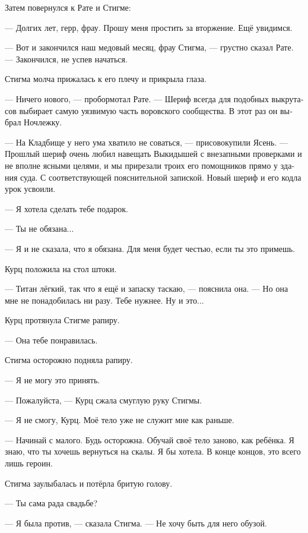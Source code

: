 \documentclass[a4paper,12pt,fleqn]{book}\usepackage{polyglossia}\setdefaultlanguage[babelshorthands=true]{russian}\setotherlanguage{english}\defaultfontfeatures{Ligatures=TeX,Mapping=tex-text}\usepackage{xcolor}\newcommand{\ml}[3]{#2}
\newcommand{\asterism}{\vspace{1em}{\centering\Large\bfseries$\ast~\ast~\ast$\par}\vspace{1em}}
\begin{document}
Затем повернулся к Рате и Стигме:

--- Долгих лет, герр, фрау.
Прошу меня простить за вторжение.
Ещё увидимся.

--- Вот и закончился наш медовый месяц, фрау Стигма, --- грустно сказал Рате.
--- Закончился, не успев начаться.

Стигма молча прижалась к его плечу и прикрыла глаза.

\asterism

--- Ничего нового, --- пробормотал Рате.
--- Шериф всегда для подобных выкрутасов выбирает самую уязвимую часть воровского сообщества.
В этот раз он выбрал Ночлежку.

--- На Кладбище у него ума хватило не соваться, --- присовокупили Ясень.
--- Прошлый шериф очень любил навещать Выкидышей с внезапными проверками и не вполне ясными целями, и мы прирезали троих его помощников прямо у здания суда.
\ml{$0$}
{С соответствующей пояснительной запиской.}
{With the relevant explanatory note.}
Новый шериф и его кодла урок усвоили.

\asterism

--- Я хотела сделать тебе подарок.

--- Ты не обязана...

--- Я и не сказала, что я обязана.
Для меня будет честью, если ты это примешь.

Курц положила на стол штоки.

--- Титан лёгкий, так что я ещё и запаску таскаю, --- пояснила она.
--- Но она мне не понадобилась ни разу.
Тебе нужнее.
Ну и это...

Курц протянула Стигме рапиру.

--- Она тебе понравилась.

Стигма осторожно подняла рапиру.

--- Я не могу это принять.

--- Пожалуйста, --- Курц сжала смуглую руку Стигмы.

--- Я не смогу, Курц.
Моё тело уже не служит мне как раньше.

--- Начинай с малого.
Будь осторожна.
Обучай своё тело заново, как ребёнка.
Я знаю, что ты хочешь вернуться на скалы.
Я бы хотела.
В конце концов, это всего лишь героин.

Стигма заулыбалась и потёрла бритую голову.

--- Ты сама рада свадьбе?

--- Я была против, --- сказала Стигма.
--- Не хочу быть для него обузой.
\end{document}

